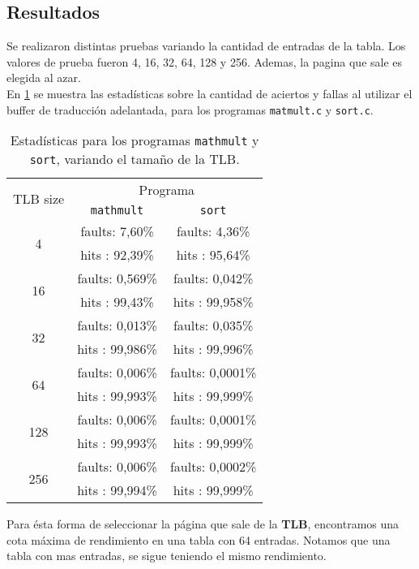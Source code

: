 \subsection*{Resultados}
Se realizaron distintas pruebas variando la cantidad de entradas de la tabla. Los valores de prueba fueron 4, 16, 32, 64, 128 y 256. Ademas, la pagina que sale es elegida al azar.\\
En \ref{tab:practica04:statics} se muestra las estadísticas sobre la cantidad de aciertos y fallas al utilizar el buffer de traducción adelantada, para los programas \texttt{matmult.c} y \texttt{sort.c}.\\ 
\begin{table}
	\center
	\begin{tabular}{|c|c|c|}
	    \hline
		\multirow{2}{*}{TLB size}   &    \multicolumn{2}{c|}{Programa}           \\
		\cline{2-3}
                                    &    \texttt{mathmult}    &    \texttt{sort} \\
		\hline
		\multirow{2}{*}{4}          &     faults:  7,60\%     &    faults:  4,36\% \\
		                            &     hits  : 92,39\%     &    hits  : 95,64\%    \\               
		\multirow{2}{*}{16}         &     faults:  0,569\%    &    faults:  0,042\%    \\
		                            &     hits  : 99,43\%     &    hits  : 99,958\%    \\             
		\multirow{2}{*}{32}         &     faults:  0,013\%    &    faults:  0,035\%    \\
		                            &     hits  : 99,986\%    &    hits  : 99,996\%    \\               
		\multirow{2}{*}{64}         &     faults:  0,006\%    &    faults:  0,0001\%    \\
		                            &     hits  : 99,993\%    &    hits  : 99,999\%    \\               
		\multirow{2}{*}{128}        &     faults:  0,006\%    &    faults:  0,0001\%    \\
		                            &     hits  : 99,993\%    &    hits  : 99,999\%    \\               
		\multirow{2}{*}{256}        &     faults:  0,006\%    &    faults:  0,0002\%    \\
		                            &     hits  : 99,994\%    &    hits  : 99,999\%    \\ \hline             
	\end{tabular}
    \caption{Estadísticas para los programas \texttt{mathmult} y \texttt{sort}, variando el tamaño de la TLB.}
	\label{tab:practica04:statics}
\end{table}
Para ésta forma de seleccionar la página  que sale de la \textbf{TLB}, encontramos una cota máxima de rendimiento en una tabla con 64 entradas. Notamos que una tabla con mas entradas, se sigue teniendo el mismo rendimiento.
\newpage
